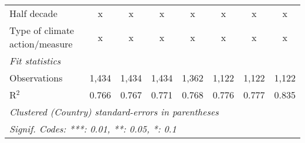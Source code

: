 \begin{table}[htbp]
\begin{tabular}{lccccccc}
      Half decade                                                                                 & x       & x       & x            & x             & x             & x             & x\\  
      Type of climate action/measure                                                              & x       & x       & x            & x             & x             & x             & x\\  
      \midrule \emph{Fit statistics}\\
      Observations                                                                                & 1,434   & 1,434   & 1,434        & 1,362         & 1,122         & 1,122         & 1,122\\  
      R$^2$                                                                                       & 0.766   & 0.767   & 0.771        & 0.768         & 0.776         & 0.777         & 0.835\\  
      \midrule
      \multicolumn{8}{l}{\emph{Clustered (Country) standard-errors in parentheses}}\\
      \multicolumn{8}{l}{\emph{Signif. Codes: ***: 0.01, **: 0.05, *: 0.1}}\\
   \end{tabular}
\end{table}


